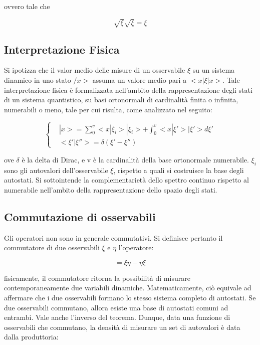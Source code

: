 \documentclass{article}
\begin{document}
ovvero tale che

\begin{equation}
    \sqrt{\xi}\sqrt{\xi}=\xi
\end{equation}


\subsection{Interpretazione Fisica}
Si ipotizza che il valor medio delle misure di un osservabile $\xi$ su un sistema dinamico in uno stato $/x>$
assuma un valore medio pari a $<x|\xi|x>$.
Tale interpretazione fisica è formalizzata nell'ambito della rappresentazione degli stati di un sistema quantistico,
su basi ortonormali di cardinalità finita o infinita, numerabili o meno, tale per cui risulta, come analizzato nel seguito:

\begin{equation}
    \left\{
    \begin{aligned}
    & |x>= \sum_{0}^{v} <x|\xi_i>|\xi_i>+ \int_{0}^{v} <x|\xi'>|\xi'>d\xi' \\
    & <\xi' | \xi''>= \delta(\xi'-\xi'')
    \end{aligned}
    \right.
\end{equation}

ove $\delta$ è la delta di Dirac, e v è la cardinalità della base ortonormale numerabile. $\xi_i$ sono gli autovalori dell'osservabile $\xi$, rispetto a quali si costruisce la base degli autostati.
Si sottointende la complementarietà dello spettro continuo rispetto al numerabile nell'ambito della rappresentazione dello spazio degli stati.


\subsection{Commutazione di osservabili}
Gli operatori non sono in generale commutativi.
Si definisce pertanto il commutatore di due osservabili $\xi$ e $\eta$ l'operatore:

\begin{equation}
    [\xi,\eta]=\xi\eta-\eta\xi
\end{equation}

fisicamente, il commutatore ritorna la possibilità di misurare contemporaneamente due variabili dinamiche.
Matematicamente, ciò equivale ad affermare che i due osservabili formano lo stesso sistema completo di autostati.
Se due osservabili commutano, allora esiste una base di autostati comuni ad entrambi.
Vale anche l'inverso del teorema.
Dunque, data una funzione di osservabili che commutano, la densità di misurare un set di autovalori è data dalla produttoria:
\end{document}

